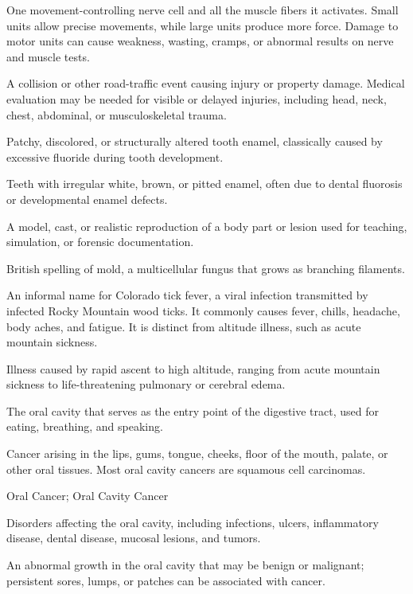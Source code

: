  One movement-controlling nerve cell and all the muscle fibers it activates. Small units allow precise movements, while large units produce more force. Damage to motor units can cause weakness, wasting, cramps, or abnormal results on nerve and muscle tests.

 A collision or other road-traffic event causing injury or property damage. Medical evaluation may be needed for visible or delayed injuries, including head, neck, chest, abdominal, or musculoskeletal trauma.

 Patchy, discolored, or structurally altered tooth enamel, classically caused by excessive fluoride during tooth development.

 Teeth with irregular white, brown, or pitted enamel, often due to dental fluorosis or developmental enamel defects.

 A model, cast, or realistic reproduction of a body part or lesion used for teaching, simulation, or forensic documentation.

 British spelling of mold, a multicellular fungus that grows as branching filaments.

 An informal name for Colorado tick fever, a viral infection transmitted by infected Rocky Mountain wood ticks. It commonly causes fever, chills, headache, body aches, and fatigue. It is distinct from altitude illness, such as acute mountain sickness.

 Illness caused by rapid ascent to high altitude, ranging from acute mountain sickness to life-threatening pulmonary or cerebral edema.

 The oral cavity that serves as the entry point of the digestive tract, used for eating,
breathing, and speaking.

 Cancer arising in the lips, gums, tongue, cheeks, floor of the mouth, palate, or other oral tissues. Most oral cavity cancers are squamous cell carcinomas.

\synonyms
Oral Cancer; Oral Cavity Cancer

 Disorders affecting the oral cavity, including infections, ulcers, inflammatory disease, dental disease, mucosal lesions, and tumors.

 An abnormal growth in the oral cavity that may be benign or malignant; persistent sores, lumps, or patches can be associated with cancer.

